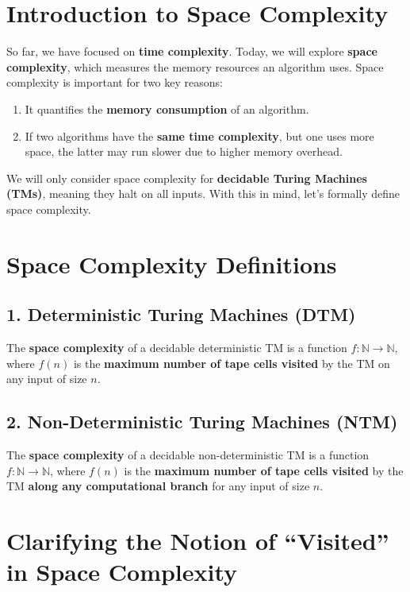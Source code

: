 \section{Introduction to Space Complexity}

So far, we have focused on \textbf{time complexity}. Today, we will explore \textbf{space complexity}, which measures the memory resources
an algorithm uses. Space complexity is important for two key reasons:

\begin{enumerate}
    \item It quantifies the \textbf{memory consumption} of an algorithm.
    \item If two algorithms have the \textbf{same time complexity}, but one uses more space, the latter may run slower due to higher memory overhead.
\end{enumerate}

We will only consider space complexity for \textbf{decidable Turing Machines (TMs)}, meaning they halt on all inputs. 
With this in mind, let's formally define space complexity.

\section{Space Complexity Definitions}

\subsection{1. Deterministic Turing Machines (DTM)}
The \textbf{space complexity} of a decidable deterministic TM is a function \( f: \mathbb{N} \rightarrow \mathbb{N} \), where \( f(n) \) is 
the \textbf{maximum number of tape cells visited} by the TM on any input of size \( n \).

\subsection{2. Non-Deterministic Turing Machines (NTM)}
The \textbf{space complexity} of a decidable non-deterministic TM is a function \( f: \mathbb{N} \rightarrow \mathbb{N} \), 
where \( f(n) \) is the \textbf{maximum number of tape cells visited} by the TM \textbf{along any computational branch} for any input of size \( n \).

\section{Clarifying the Notion of ``Visited'' in Space Complexity}

